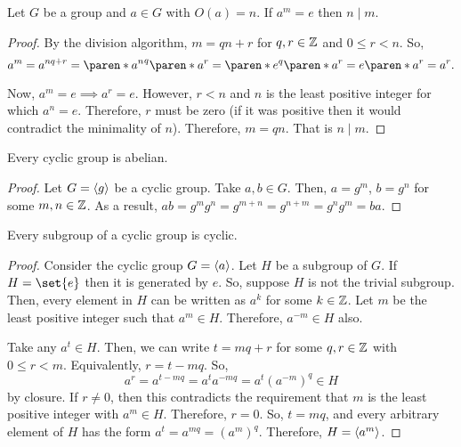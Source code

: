 \documentclass[11pt]{penrose}
\begin{document}
\begin{nthm}
    Let $G$ be a group and $a \in G$ with $O(a) = n$. If $a^m = e$ then $n \mid m$.
\end{nthm}
\begin{proof}
    By the division algorithm, $m = qn + r$ for $q, r \in \mathbb{Z}$ and $0 \leq r < n$. So,
    \begin{equation*}
        a^m = a^{nq + r} = \paren*{{a^n}^q} \paren*{a^r} = \paren*{e^q} \paren*{a^r} = e \paren*{a^r} = a^r.
    \end{equation*}

    Now, $a^m = e \implies a^r = e$. However, $r < n$ and $n$ is the least positive integer for which $a^n = e$. Therefore, $r$ must be zero (if it was positive then it would contradict the minimality of $n$). Therefore, $m = qn$. That is $n \mid m$.
\end{proof}

\begin{nthm}
    Every cyclic group is abelian.
\end{nthm}
\begin{proof}
    Let $G = \langle g\rangle$ be a cyclic group. Take $a, b \in G$. Then, $a = g^m$, $b = g^n$ for some $m, n \in \mathbb{Z}$. As a result, $ab = g^m g^n = g^{m+n} = g^{n+m} = g^n g^m = ba$.
\end{proof}

\begin{nthm}
    Every subgroup of a cyclic group is cyclic.
\end{nthm}
\begin{proof}
    Consider the cyclic group $G = \langle a\rangle$. Let $H$ be a subgroup of $G$. If $H = \set{e}$ then it is generated by $e$. So, suppose $H$ is not the trivial subgroup. Then, every element in $H$ can be written as $a^k$ for some $k \in \mathbb{Z}$. Let $m$ be the least positive integer such that $a^m \in H$. Therefore, $a^{-m} \in H$ also.

    Take any $a^t \in H$. Then, we can write $t = mq + r$ for some $q, r \in \mathbb{Z}$ with $0 \leq r < m$. Equivalently, $r = t - mq$. So,
    \begin{equation*}
        a^r = a^{t - mq} = a^{t} a^{-mq} = a^{t} (a^{-m})^{q} \in H
    \end{equation*}
    by closure. If $r \neq 0$, then this contradicts the requirement that $m$ is the least positive integer with $a^m \in H$. Therefore, $r = 0$. So, $t = mq$, and every arbitrary element of $H$ has the form $a^t = a^{mq} = (a^{m})^{q}$. Therefore, $H = \langle a^m\rangle$.
\end{proof}
\end{document}
